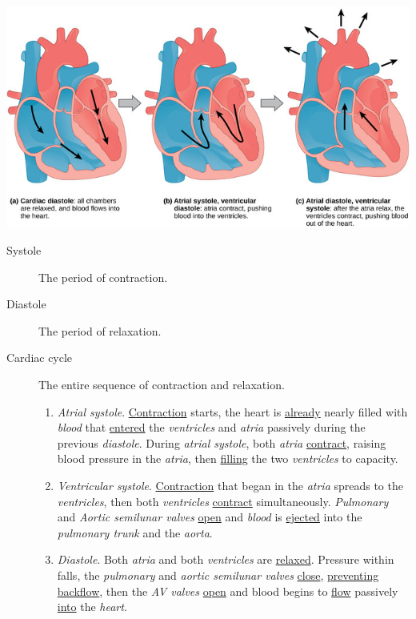 \documentclass[11pt]{article}
\begin{document}
\begin{center}
\includegraphics[width=.9\linewidth]{Ch. 8/figure-40-03-03_2016-10-25_23-21-01.jpeg}
\end{center}

\begin{description}
\item[{Systole}] The period of contraction.
\item[{Diastole}] The period of relaxation.
\item[{Cardiac cycle}] The entire sequence of contraction and relaxation.
\begin{enumerate}
\item \emph{Atrial systole}. \uline{Contraction} starts, the heart is \uline{already} nearly filled
with \emph{blood} that \uline{entered} the \emph{ventricles} and \emph{atria} passively during the
previous \emph{diastole}. During \emph{atrial systole}, both \emph{atria} \uline{contract}, raising
blood pressure in the \emph{atria}, then \uline{filling} the two \emph{ventricles} to
capacity.
\item \emph{Ventricular systole}. \uline{Contraction} that began in the \emph{atria} spreads to the
\emph{ventricles}, then both \emph{ventricles} \uline{contract} simultaneously. \emph{Pulmonary} and
\emph{Aortic semilunar valves} \uline{open} and \emph{blood} is \uline{ejected} into the \emph{pulmonary
trunk} and the \emph{aorta}.
\item \emph{Diastole}. Both \emph{atria} and both \emph{ventricles} are \uline{relaxed}. Pressure within
falls, the \emph{pulmonary} and \emph{aortic semilunar valves} \uline{close}, \uline{preventing
backflow}, then the \emph{AV valves} \uline{open} and blood begins to \uline{flow} passively
\uline{into} the \emph{heart}.
\end{enumerate}
\end{description}
\end{document}
